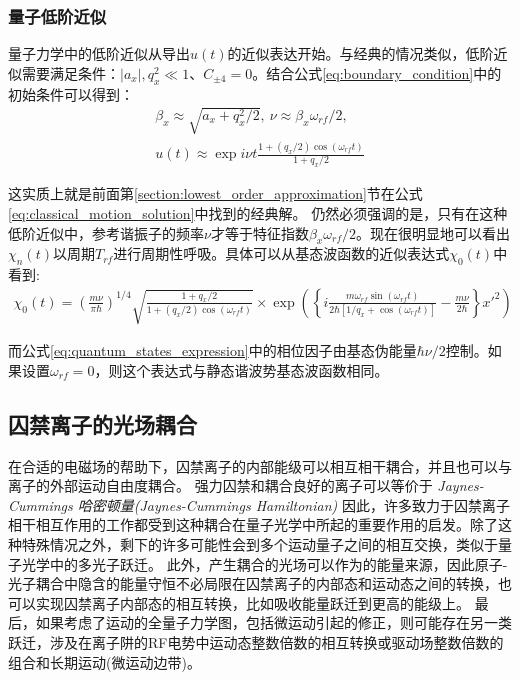 \subsubsection[量子低阶近似]{量子低阶近似}
量子力学中的低阶近似从导出$u(t)$的近似表达开始。与经典的情况类似，低阶近似需要满足条件：$|a_x|,q_x^2\ll 1$、$C_{\pm 4}=0$。结合公式\eqref{eq:boundary_condition}中的初始条件可以得到：
\begin{align}
    \beta_x\approx\sqrt{a_x+q_x^2/2},\ \nu\approx\beta_x\omega_{rf}/2,\\
    u(t)\approx\exp{i\nu t}\frac{1+(q_x/2)\cos(\omega_{rf}t)}{1+q_x/2}\label{eq:quantum_lowest_order_approximation}
\end{align}

这实质上就是前面第\ref{section:lowest_order_approximation}节在公式\eqref{eq:classical_motion_solution}中找到的经典解。
仍然必须强调的是，只有在这种低阶近似中，参考谐振子的频率$\nu$才等于特征指数$\beta_x\omega_{rf}/2$。现在很明显地可以看出$\chi_n(t)$以周期$T_{rf}$进行周期性呼吸。具体可以从基态波函数的近似表达式$\chi_0(t)$中看到:
\begin{align}
    \chi_0(t)=\left(\frac{m\nu}{\pi \hbar}\right)^{1/4}\sqrt{\frac{1+q_x/2}{1+(q_x/2)\cos(\omega_{rf}t)}}
    \times \exp\left(\left\{i\frac{m\omega_{rf}\sin(\omega_{rf}t)}{2\hbar\left[1/q_x+\cos(\omega_{rf}t)\right]}-\frac{m\nu}{2\hbar}\right\}x'^2\right)
\end{align}

而公式\eqref{eq:quantum_states_expression}中的相位因子由基态伪能量$\hbar\nu/2$控制。如果设置$\omega_{rf}=0$，则这个表达式与静态谐波势基态波函数相同。



\subsection[囚禁离子的光场耦合]{囚禁离子的光场耦合}

在合适的电磁场的帮助下，囚禁离子的内部能级可以相互相干耦合，并且也可以与离子的外部运动自由度耦合。
强力囚禁和耦合良好的离子可以等价于
\emph{Jaynes-Cummings 哈密顿量(Jaynes-Cummings Hamiltonian)}\cite[]{Janszky_Yushin_1986}
因此，许多致力于囚禁离子相干相互作用的工作都受到这种耦合在量子光学中所起的重要作用的启发。除了这种特殊情况之外，剩下的许多可能性会到多个运动量子之间的相互交换，类似于量子光学中的多光子跃迁。
此外，产生耦合的光场可以作为的能量来源，因此原子-光子耦合中隐含的能量守恒不必局限在囚禁离子的内部态和运动态之间的转换，也可以实现囚禁离子内部态的相互转换，比如吸收能量跃迁到更高的能级上。
最后，如果考虑了运动的全量子力学图，包括微运动引起的修正，则可能存在另一类跃迁，涉及在离子阱的RF电势中运动态整数倍数的相互转换或驱动场整数倍数的组合和长期运动(微运动边带)。

